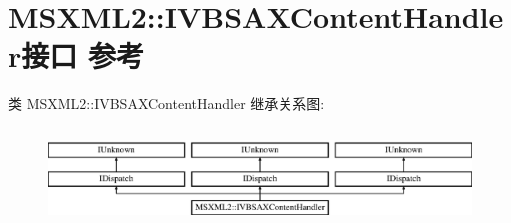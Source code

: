\hypertarget{interface_m_s_x_m_l2_1_1_i_v_b_s_a_x_content_handler}{}\section{M\+S\+X\+M\+L2\+:\+:I\+V\+B\+S\+A\+X\+Content\+Handler接口 参考}
\label{interface_m_s_x_m_l2_1_1_i_v_b_s_a_x_content_handler}
类 M\+S\+X\+M\+L2\+:\+:I\+V\+B\+S\+A\+X\+Content\+Handler 继承关系图\+:\begin{figure}[H]
\begin{center}
\leavevmode
\includegraphics[height=2.629108cm]{interface_m_s_x_m_l2_1_1_i_v_b_s_a_x_content_handler}
\end{center}
\end{figure}
